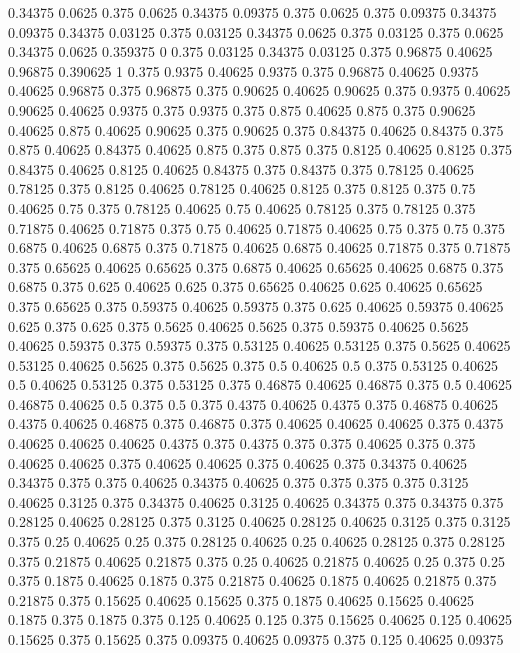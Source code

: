 0.34375 0.0625
0.375 0.0625
0.34375 0.09375
0.375 0.0625
0.375 0.09375
0.34375 0.09375
0.34375 0.03125
0.375 0.03125
0.34375 0.0625
0.375 0.03125
0.375 0.0625
0.34375 0.0625
0.359375 0
0.375 0.03125
0.34375 0.03125
0.375 0.96875
0.40625 0.96875
0.390625 1
0.375 0.9375
0.40625 0.9375
0.375 0.96875
0.40625 0.9375
0.40625 0.96875
0.375 0.96875
0.375 0.90625
0.40625 0.90625
0.375 0.9375
0.40625 0.90625
0.40625 0.9375
0.375 0.9375
0.375 0.875
0.40625 0.875
0.375 0.90625
0.40625 0.875
0.40625 0.90625
0.375 0.90625
0.375 0.84375
0.40625 0.84375
0.375 0.875
0.40625 0.84375
0.40625 0.875
0.375 0.875
0.375 0.8125
0.40625 0.8125
0.375 0.84375
0.40625 0.8125
0.40625 0.84375
0.375 0.84375
0.375 0.78125
0.40625 0.78125
0.375 0.8125
0.40625 0.78125
0.40625 0.8125
0.375 0.8125
0.375 0.75
0.40625 0.75
0.375 0.78125
0.40625 0.75
0.40625 0.78125
0.375 0.78125
0.375 0.71875
0.40625 0.71875
0.375 0.75
0.40625 0.71875
0.40625 0.75
0.375 0.75
0.375 0.6875
0.40625 0.6875
0.375 0.71875
0.40625 0.6875
0.40625 0.71875
0.375 0.71875
0.375 0.65625
0.40625 0.65625
0.375 0.6875
0.40625 0.65625
0.40625 0.6875
0.375 0.6875
0.375 0.625
0.40625 0.625
0.375 0.65625
0.40625 0.625
0.40625 0.65625
0.375 0.65625
0.375 0.59375
0.40625 0.59375
0.375 0.625
0.40625 0.59375
0.40625 0.625
0.375 0.625
0.375 0.5625
0.40625 0.5625
0.375 0.59375
0.40625 0.5625
0.40625 0.59375
0.375 0.59375
0.375 0.53125
0.40625 0.53125
0.375 0.5625
0.40625 0.53125
0.40625 0.5625
0.375 0.5625
0.375 0.5
0.40625 0.5
0.375 0.53125
0.40625 0.5
0.40625 0.53125
0.375 0.53125
0.375 0.46875
0.40625 0.46875
0.375 0.5
0.40625 0.46875
0.40625 0.5
0.375 0.5
0.375 0.4375
0.40625 0.4375
0.375 0.46875
0.40625 0.4375
0.40625 0.46875
0.375 0.46875
0.375 0.40625
0.40625 0.40625
0.375 0.4375
0.40625 0.40625
0.40625 0.4375
0.375 0.4375
0.375 0.375
0.40625 0.375
0.375 0.40625
0.40625 0.375
0.40625 0.40625
0.375 0.40625
0.375 0.34375
0.40625 0.34375
0.375 0.375
0.40625 0.34375
0.40625 0.375
0.375 0.375
0.375 0.3125
0.40625 0.3125
0.375 0.34375
0.40625 0.3125
0.40625 0.34375
0.375 0.34375
0.375 0.28125
0.40625 0.28125
0.375 0.3125
0.40625 0.28125
0.40625 0.3125
0.375 0.3125
0.375 0.25
0.40625 0.25
0.375 0.28125
0.40625 0.25
0.40625 0.28125
0.375 0.28125
0.375 0.21875
0.40625 0.21875
0.375 0.25
0.40625 0.21875
0.40625 0.25
0.375 0.25
0.375 0.1875
0.40625 0.1875
0.375 0.21875
0.40625 0.1875
0.40625 0.21875
0.375 0.21875
0.375 0.15625
0.40625 0.15625
0.375 0.1875
0.40625 0.15625
0.40625 0.1875
0.375 0.1875
0.375 0.125
0.40625 0.125
0.375 0.15625
0.40625 0.125
0.40625 0.15625
0.375 0.15625
0.375 0.09375
0.40625 0.09375
0.375 0.125
0.40625 0.09375
